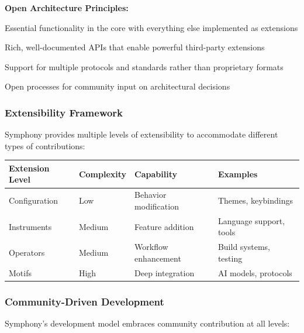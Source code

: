 \textbf{Open Architecture Principles:}

\begin{description}[leftmargin=3.5cm,labelwidth=3cm]
    \item[\textbf{Minimal Core}] Essential functionality in the core with everything else implemented as extensions
    
    \item[\textbf{Extension APIs}] Rich, well-documented APIs that enable powerful third-party extensions
    
    \item[\textbf{Protocol Agnostic}] Support for multiple protocols and standards rather than proprietary formats
    
    \item[\textbf{Community Governance}] Open processes for community input on architectural decisions
\end{description}

\subsubsection{Extensibility Framework}

Symphony provides multiple levels of extensibility to accommodate different types of contributions:

\begin{center}
\begin{tabular}{@{}llll@{}}
\toprule
\textbf{Extension Level} & \textbf{Complexity} & \textbf{Capability} & \textbf{Examples} \\
\midrule
Configuration & Low & Behavior modification & Themes, keybindings \\
Instruments & Medium & Feature addition & Language support, tools \\
Operators & Medium & Workflow enhancement & Build systems, testing \\
Motifs & High & Deep integration & AI models, protocols \\
\bottomrule
\end{tabular}
\label{tab:extensibility-framework}
\end{center}

\subsubsection{Community-Driven Development}

Symphony's development model embraces community contribution at all levels:

